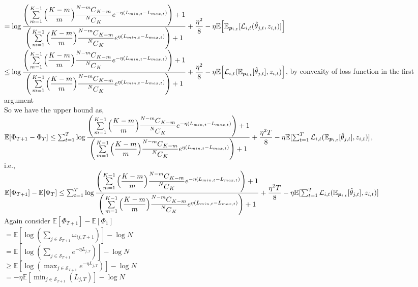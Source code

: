 \documentclass{article}
\newcommand\Mycomb[2][^n]{\prescript{#1\mkern-0.5mu}{}C_{#2}}
\theoremstyle{definition}
\begin{document}
    $=\log{{\dfrac{\Bigg(\sum\limits_{m=1}^{K-1}\Big(\dfrac{K-m}{m}\Big){\dfrac{\Mycomb[N-m]{K-m}}{\Mycomb[N]{K}}}e^{-\eta(L_{min,t}-L_{max,t})}\Bigg)+1}{\Bigg(\sum\limits_{m=1}^{K-1}\Big(\dfrac{K-m}{m}\Big){\dfrac{\Mycomb[N-m]{K-m}}{\Mycomb[N]{K}}}e^{\eta(L_{min,t}-L_{max,t})}\Bigg)+1}}}+\dfrac{\eta^{2}}{8}-\eta\mathbb{E}\Big[\mathbb{E}_{\bm{p}_{i,t}}[\mathcal{L}_{i,t}(\hat{\theta}_{j,t},z_{i,t})]\Big]$\\
    $\leq\log{{\dfrac{\Bigg(\sum\limits_{m=1}^{K-1}\Big(\dfrac{K-m}{m}\Big){\dfrac{\Mycomb[N-m]{K-m}}{\Mycomb[N]{K}}}e^{-\eta(L_{min,t}-L_{max,t})}\Bigg)+1}{\Bigg(\sum\limits_{m=1}^{K-1}\Big(\dfrac{K-m}{m}\Big){\dfrac{\Mycomb[N-m]{K-m}}{\Mycomb[N]{K}}}e^{\eta(L_{min,t}-L_{max,t})}\Bigg)+1}}}+\dfrac{\eta^{2}}{8}-\eta\mathbb{E}\Big[\mathcal{L}_{i,t}(\mathbb{E}_{\bm{p}_{i,t}}[\hat{\theta}_{j,t}],z_{i,t})\Big]$, by convexity of loss function in the first argument\\
    So we have the upper bound as,\\
    $\mathbb{E}[\Phi_{T+1}-\Phi_{T}]\leq\sum_{t=1}^{T}\log{{\dfrac{\Bigg(\sum\limits_{m=1}^{K-1}\Big(\dfrac{K-m}{m}\Big){\dfrac{\Mycomb[N-m]{K-m}}{\Mycomb[N]{K}}}e^{-\eta(L_{min,t}-L_{max,t})}\Bigg)+1}{\Bigg(\sum\limits_{m=1}^{K-1}\Big(\dfrac{K-m}{m}\Big){\dfrac{\Mycomb[N-m]{K-m}}{\Mycomb[N]{K}}}e^{\eta(L_{min,t}-L_{max,t})}\Bigg)+1}}}+\dfrac{\eta^{2}T}{8}-\eta\mathbb{E}[\sum_{t=1}^{T}\mathcal{L}_{i,t}(\mathbb{E}_{\bm{p}_{i,t}}[\hat{\theta}_{j,t}],z_{i,t})]$,\\
    i.e.,\\
    $\mathbb{E}[\Phi_{T+1}]-\mathbb{E}[\Phi_{T}]\leq\sum_{t=1}^{T}\log{{\dfrac{\Bigg(\sum\limits_{m=1}^{K-1}\Big(\dfrac{K-m}{m}\Big){\dfrac{\Mycomb[N-m]{K-m}}{\Mycomb[N]{K}}}e^{-\eta(L_{min,t}-L_{max,t})}\Bigg)+1}{\Bigg(\sum\limits_{m=1}^{K-1}\Big(\dfrac{K-m}{m}\Big){\dfrac{\Mycomb[N-m]{K-m}}{\Mycomb[N]{K}}}e^{\eta(L_{min,t}-L_{max,t})}\Bigg)+1}}}+\dfrac{\eta^{2}T}{8}-\eta\mathbb{E}[\sum_{t=1}^{T}\mathcal{L}_{i,t}(\mathbb{E}_{\bm{p}_{i,t}}[\hat{\theta}_{j,t}],z_{i,t})]$\\
    Again consider $\mathbb{E}[\Phi_{T+1}]-\mathbb{E}[\Phi_{1}]$\\
    $=\mathbb{E}[\log{(\sum_{j\in\mathcal{S}_{T+1}}\omega_{ij,T+1})}]-\log{N}$\\
    $=\mathbb{E}[\log{(\sum_{j\in\mathcal{S}_{T+1}}e^{-\eta L_{j,T}})}]-\log{N}$\\
    $\geq\mathbb{E}[\log{(\max_{j\in\mathcal{S}_{T+1}}e^{-\eta L_{j,T}})}]-\log{N}$\\
    $=-\eta\mathbb{E}[\min_{j\in\mathcal{S}_{T+1}}(L_{j,T})]-\log{N}$\\
\end{document}
